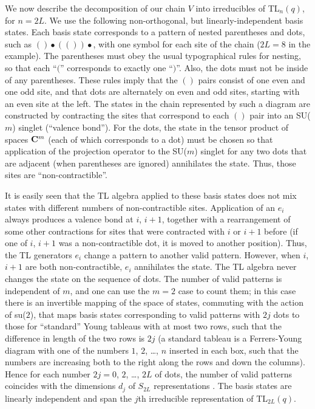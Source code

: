 \documentclass[twocolumn,floats,pra]{revtex4}
\begin{document}
We now describe the decomposition of our chain $V$ into
irreducibles of TL$_n(q)$, for $n=2L$. We use the following
non-orthogonal, but linearly-independent basis states. Each basis
state corresponds to a pattern of nested parentheses and dots,
such as $()\bullet(())\bullet$, with one symbol for each site of
the chain ($2L=8$ in the example). The parentheses must obey the
usual typographical rules for nesting, so that each ``$($''
corresponds to exactly one ``$)$''. Also, the dots must not be
inside of any parentheses. These rules imply that the $()$ pairs
consist of one even and one odd site, and that dots are
alternately on even and odd sites, starting with an even site at
the left. The states in the chain represented by such a diagram
are constructed by contracting the sites that correspond to each
$()$ pair into an SU($m$) singlet (``valence bond''). For the
dots, the state in the tensor product of spaces ${\bf C}^m$ (each
of which corresponds to a dot) must be chosen so that application
of the projection operator to the SU($m$) singlet for any two dots
that are adjacent (when parentheses are ignored) annihilates the
state. Thus, those sites are ``non-contractible''.

It is easily seen that the TL algebra applied to these basis
states does not mix states with different numbers of
non-contractible sites. Application of an $e_i$ always produces a
valence bond at $i$, $i+1$, together with a rearrangement of some
other contractions for sites that were contracted with $i$ or
$i+1$ before (if one of $i$, $i+1$ was a non-contractible dot, it
is moved to another position). Thus, the TL generators $e_i$
change a pattern to another valid pattern. However, when $i$,
$i+1$ are both non-contractible, $e_i$ annihilates the state. The
TL algebra never changes the state on the sequence of dots. The
number of valid patterns is independent of $m$, and one can use
the $m=2$ case to count them; in this case there is an invertible
mapping of the space of states, commuting with the action of
su($2$), that maps basis states corresponding to valid patterns
with $2j$ dots to those for ``standard'' Young tableaus with at
most two rows, such that the difference in length of the two rows
is $2j$ (a standard tableau is a Ferrers-Young diagram with one of
the numbers $1$, $2$, \ldots, $n$ inserted in each box, such that
the numbers are increasing both to the right along the rows and
down the columns). Hence for each number $2j=0$, $2$, \ldots, $2L$
of dots, the number of valid patterns coincides with the
dimensions $d_j$ of $S_{2L}$ representations \cite{sagan}. The
basis states are linearly independent and span the $j$th
irreducible representation of TL$_{2L}(q)$.
\end{document}
